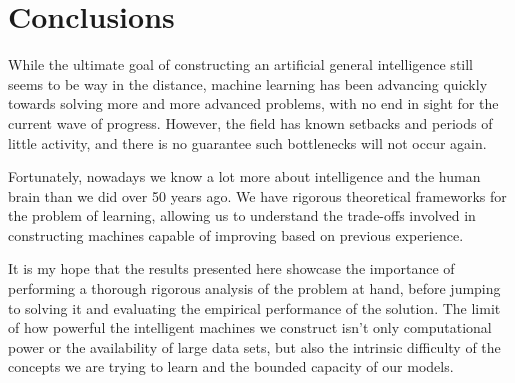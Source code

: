 \chapter{Conclusions}

While the ultimate goal of constructing an artificial general intelligence still seems to be way in the distance, machine learning has been advancing quickly towards solving more and more advanced problems, with no end in sight for the current wave of progress. However, the field has known setbacks and periods of little activity, and there is no guarantee such bottlenecks will not occur again.

Fortunately, nowadays we know a lot more about intelligence and the human brain than we did over 50 years ago. We have rigorous theoretical frameworks for the problem of learning, allowing us to understand the trade-offs involved in constructing machines capable of improving based on previous experience.

It is my hope that the results presented here showcase the importance of performing a thorough rigorous analysis of the problem at hand, before jumping to solving it and evaluating the empirical performance of the solution. The limit of how powerful the intelligent machines we construct isn't only computational power or the availability of large data sets, but also the intrinsic difficulty of the concepts we are trying to learn and the bounded capacity of our models.

